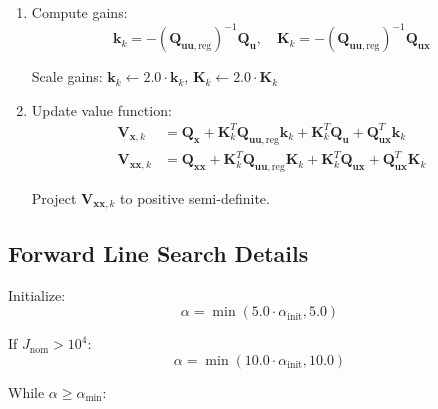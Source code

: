 \documentclass[11pt,a4paper]{article}
\begin{document}
\begin{enumerate}
    \item Compute gains:
    \begin{equation}
    \mathbf{k}_k = -(\mathbf{Q}_{\mathbf{uu},\text{reg}})^{-1} \mathbf{Q}_{\mathbf{u}}, \quad \mathbf{K}_k = -(\mathbf{Q}_{\mathbf{uu},\text{reg}})^{-1} \mathbf{Q}_{\mathbf{ux}}
    \end{equation}
    
    Scale gains: $\mathbf{k}_k \leftarrow 2.0 \cdot \mathbf{k}_k$, $\mathbf{K}_k \leftarrow 2.0 \cdot \mathbf{K}_k$
    
    \item Update value function:
    \begin{align}
    \mathbf{V}_{\mathbf{x},k} &= \mathbf{Q}_{\mathbf{x}} + \mathbf{K}_k^T \mathbf{Q}_{\mathbf{uu},\text{reg}} \mathbf{k}_k + \mathbf{K}_k^T \mathbf{Q}_{\mathbf{u}} + \mathbf{Q}_{\mathbf{ux}}^T \mathbf{k}_k \\
    \mathbf{V}_{\mathbf{xx},k} &= \mathbf{Q}_{\mathbf{xx}} + \mathbf{K}_k^T \mathbf{Q}_{\mathbf{uu},\text{reg}} \mathbf{K}_k + \mathbf{K}_k^T \mathbf{Q}_{\mathbf{ux}} + \mathbf{Q}_{\mathbf{ux}}^T \mathbf{K}_k
    \end{align}
    
    Project $\mathbf{V}_{\mathbf{xx},k}$ to positive semi-definite.
\end{enumerate}

\subsection{Forward Line Search Details}

Initialize:
\begin{equation}
\alpha = \min(5.0 \cdot \alpha_{\text{init}}, 5.0)
\end{equation}

If $J_{\text{nom}} > 10^4$:
\begin{equation}
\alpha = \min(10.0 \cdot \alpha_{\text{init}}, 10.0)
\end{equation}

While $\alpha \geq \alpha_{\text{min}}$:
\end{document}
